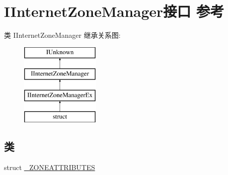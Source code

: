 \hypertarget{interface_i_internet_zone_manager}{}\section{I\+Internet\+Zone\+Manager接口 参考}
\label{interface_i_internet_zone_manager}
类 I\+Internet\+Zone\+Manager 继承关系图\+:\begin{figure}[H]
\begin{center}
\leavevmode
\includegraphics[height=4.000000cm]{interface_i_internet_zone_manager}
\end{center}
\end{figure}
\subsection*{类}
\begin{DoxyCompactItemize}
\item 
struct \hyperlink{struct_i_internet_zone_manager_1_1___z_o_n_e_a_t_t_r_i_b_u_t_e_s}{\+\_\+\+Z\+O\+N\+E\+A\+T\+T\+R\+I\+B\+U\+T\+ES}
\end{DoxyCompactItemize}
